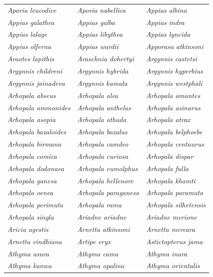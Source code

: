 \documentclass[runningheads]{llncs}
\begin{document}
\begin{longtable}{lll}
\textit{Aporia leucodice} & \textit{Aporia nabellica} & \textit{Appias albina} \\
\textit{Appias galathea} & \textit{Appias galba} & \textit{Appias indra} \\
\textit{Appias lalage} & \textit{Appias libythea} & \textit{Appias lyncida} \\
\textit{Appias olferna} & \textit{Appias wardii} & \textit{Apporasa atkinsoni} \\
\textit{Araotes lapithis} & \textit{Araschnia dohertyi} & \textit{Argynnis castetsi} \\
\textit{Argynnis childreni} & \textit{Argynnis hybrida} & \textit{Argynnis hyperbius} \\
\textit{Argynnis jainadeva} & \textit{Argynnis kamala} & \textit{Argynnis westphali} \\
\textit{Arhopala abseus} & \textit{Arhopala alea} & \textit{Arhopala amantes} \\
\textit{Arhopala ammonides} & \textit{Arhopala anthelus} & \textit{Arhopala asinarus} \\
\textit{Arhopala asopia} & \textit{Arhopala athada} & \textit{Arhopala atrax} \\
\textit{Arhopala bazaloides} & \textit{Arhopala bazalus} & \textit{Arhopala belphoebe} \\
\textit{Arhopala birmana} & \textit{Arhopala camdeo} & \textit{Arhopala centaurus} \\
\textit{Arhopala comica} & \textit{Arhopala curiosa} & \textit{Arhopala dispar} \\
\textit{Arhopala dodonaea} & \textit{Arhopala eumolphus} & \textit{Arhopala fulla} \\
\textit{Arhopala ganesa} & \textit{Arhopala hellenore} & \textit{Arhopala khamti} \\
\textit{Arhopala oenea} & \textit{Arhopala paraganesa} & \textit{Arhopala paramuta} \\
\textit{Arhopala perimuta} & \textit{Arhopala rama} & \textit{Arhopala silhetensis} \\
\textit{Arhopala singla} & \textit{Ariadne ariadne} & \textit{Ariadne merione} \\
\textit{Aricia agestis} & \textit{Arnetta atkinsoni} & \textit{Arnetta mercara} \\
\textit{Arnetta vindhiana} & \textit{Artipe eryx} & \textit{Astictopterus jama} \\
\textit{Athyma asura} & \textit{Athyma cama} & \textit{Athyma inara} \\
\textit{Athyma kanwa} & \textit{Athyma opalina} & \textit{Athyma orientalis} \\

\end{longtable}
\end{document}
